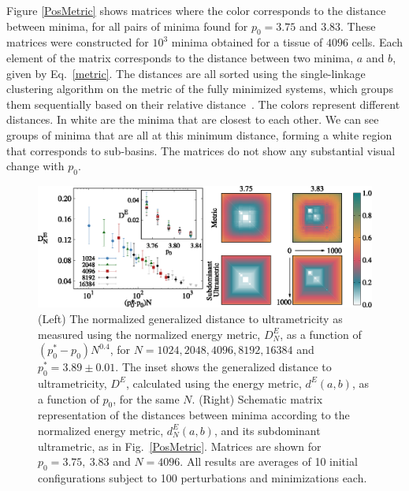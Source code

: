 \documentclass[reprint,amsmath,amssymb,aps]{revtex4-2}
\begin{document}
Figure \ref{PosMetric} shows matrices where the color corresponds to the distance between minima, for all pairs of minima found for $p_0=3.75$ and $3.83$. These matrices were constructed for $10^3$ minima obtained for a tissue of $4096$ cells. Each element of the matrix corresponds to the distance between two minima, $a$ and $b$, given by Eq.~\eqref{metric}. The distances are all sorted using the single-linkage clustering algorithm on the metric of the fully minimized systems, which groups them sequentially based on their relative distance~\cite{Murtagh1983}. The colors represent different distances. In white are the minima that are closest to each other. We can see groups of minima that are all at this minimum distance, forming a white region that corresponds to sub-basins. The matrices do not show any substantial visual change with $p_0$.

\begin{figure}[t!]
	\includegraphics{fig3.eps}
	\caption{\label{EnergyMetric} (Left) The normalized generalized distance to ultrametricity as measured using the normalized energy metric, $D^E_N$,  as a function of $(p_0^*-p_0)N^{0.4}$, for $N=1024, 2048, 4096, 8192, 16384$ and $p_0^*=3.89\pm 0.01$. The inset shows the generalized distance to ultrametricity, $D^E$, calculated using the energy metric, $d^E(a,b)$, as a function of $p_0$, for the same $N$. (Right) Schematic matrix representation of the distances between minima according to the normalized energy metric, $d_N^E(a,b)$, and its subdominant ultrametric, as in Fig.~\ref{PosMetric}. Matrices are shown for $p_0=3.75,\ 3.83$ and $N=4096$. All results are averages of 10 initial configurations subject to 100 perturbations and minimizations each.
	}
\end{figure}
\end{document}
